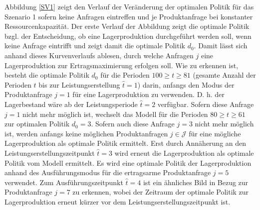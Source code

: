 Abbildung \ref{SV1} zeigt den Verlauf der Veränderung der optimalen Politik für das Szenario 1 sofern keine Anfragen eintreffen und je Produktanfrage bei konstanter Ressourcenkapazität. Der erste Verlauf der Abbildung zeigt die optimale Politik bzgl. der Entscheidung, ob eine Lagerproduktion durchgeführt werden soll, wenn keine Anfrage eintrifft und zeigt damit die optimale Politik $d_0$. Damit lässt sich anhand dieses Kurvenverlaufs ablesen, durch welche Anfragen $j$ eine Lagerproduktion zur Ertragsmaximierung erfolgen soll. Wie zu erkennen ist, besteht die optimale Politik $d_0$ für die Perioden $100\ge t \ge 81$ (gesamte Anzahl der Perioden $t$ bis zur Leistungserstellung $\hat t = 1$) darin, anfangs den Modus der Produktanfrage $j=1$ für eine Lagerproduktion zu verwenden. D. h. der Lagerbestand wäre ab der Leistungsperiode $\hat t=2$ verfügbar. Sofern diese Anfrage $j=1$ nicht mehr möglich ist, wechselt das Modell für die Perioden $80\ge t \ge 61$ zur optimalen Politik $d_0=3$. Sofern auch diese Anfrage $j=3$ nicht mehr möglich ist, werden anfangs keine möglichen Produktanfragen $j\in\mathcal{J}$ für eine mögliche Lagerproduktion als optimale Politik ermittelt. Erst durch Annäherung an den Leistungserstellungszeitpunkt $\hat t = 3$ wird erneut die Lagerproduktion als optimale Politik vom Modell ermittelt. Es wird eine optimale Politik der Lagerproduktion anhand des Ausführungsmodus für die ertragsarme Produktanfrage $j=5$ verwendet. Zum Ausführungszeitpunkt $\hat t = 4$ ist ein ähnliches Bild in Bezug zur Produktanfrage $j=7$ zu erkennen, wobei der Zeitraum der optimale Politik zur Lagerproduktion erneut kürzer vor dem Leistungserstellungszeitpunkt ist.

